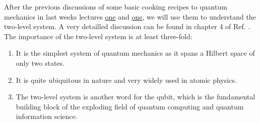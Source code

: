 After the previous discussions of some basic cooking recipes to quantum mechanics in last weeks lectures \href{https://www.authorea.com/326007/wyOpqBcLPiiNhswBbwDHbA}{one} and \href{https://www.authorea.com/326007/wyOpqBcLPiiNhswBbwDHbA}{one}, we will use them to understand the two-level system. A very detailled discussion can be found in chapter 4 of Ref. \cite{1}. The importance of the two-level system is at least three-fold:
\begin{enumerate}
\item It is the simplest system of quantum mechanics as it spans a Hilbert space of only two states.
\item It is quite ubiquitous in nature and very widely used in atomic physics.
\item The two-level system is another word for the qubit, which is the fundamental building block of the exploding field of quantum computing and quantum information science.
\end{enumerate}

